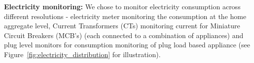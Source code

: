 \documentclass[10pt]{sensys-proc}
\newcommand{\figref}[1]{Figure~\ref{#1}}
\begin{document}
\noindent\textbf{Electricity monitoring:} %
We chose to monitor electricity consumption across different resolutions - electricity meter monitoring the consumption at the home aggregate level, Current Transformers (CTs) monitoring current for Miniature Circuit Breakers (MCB's) (each connected to a combination of appliances) and plug level monitors for consumption monitoring of plug load based appliance (see \figref{fig:electricity_distribution} for illustration). 
\end{document}
